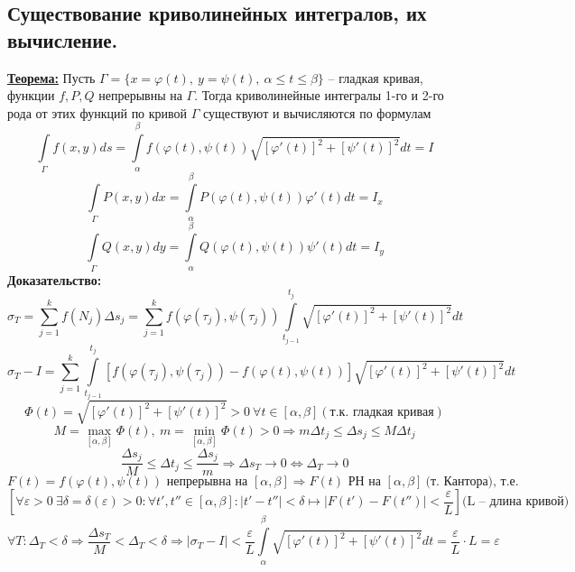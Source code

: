 \documentclass[a4paper,12pt]{article} %
\begin{document}
\subsection{Существование криволинейных интегралов, их вычисление.}
\underline{\textbf{Теорема:}} Пусть $\Gamma = \{ x = \varphi(t), ~y = \psi(t), ~\alpha \leqslant t \leqslant \beta \}$ -- гладкая кривая, функции $f, P, Q$ непрерывны на $\Gamma$. Тогда криволинейные интегралы 1-го и 2-го рода от этих функций по кривой $\Gamma$ существуют и вычисляются по формулам
\[ \int\limits_{\Gamma} f(x, y)ds = \int\limits_{\alpha}^{\beta} f(\varphi(t), \psi(t)) \sqrt{\left[ \varphi'(t) \right]^2 + \left[ \psi'(t) \right]^2}dt = I \]
\[ \int\limits_{\Gamma} P(x, y)dx = \int\limits_{\alpha}^{\beta} P(\varphi(t), \psi(t)) \varphi'(t)dt = I_x \]
\[ \int\limits_{\Gamma} Q(x, y)dy = \int\limits_{\alpha}^{\beta} Q(\varphi(t), \psi(t)) \psi'(t)dt = I_y \]
\textbf{Доказательство:} 
\[ \sigma_T = \sum\limits_{j=1}^{k} f(N_j) \Delta s_j = \sum\limits_{j=1}^{k} f(\varphi(\tau_j), \psi(\tau_j))  \int\limits_{t_{j-1}}^{t_j} \sqrt{\left[ \varphi'(t) \right]^2 + \left[ \psi'(t) \right]^2}dt \]
\[ \sigma_T - I = \sum\limits_{j=1}^{k} \int\limits_{t_{j-1}}^{t_j} \left[ f(\varphi(\tau_j), \psi(\tau_j)) - f(\varphi(t), \psi(t)) \right] \sqrt{\left[ \varphi'(t) \right]^2 + \left[ \psi'(t) \right]^2}dt \]
\[ \Phi (t) = \sqrt{\left[ \varphi'(t) \right]^2 + \left[ \psi'(t) \right]^2} > 0 \ \forall t \in [\alpha, \beta] (\text{т.к. гладкая кривая}) \]
\[ M = \max\limits_{[\alpha, \beta]} \Phi(t), \ m = \min\limits_{[\alpha, \beta]} \Phi(t) > 0 \Rightarrow m \Delta t_j \leqslant \Delta s_j \leqslant M \Delta t_j \]
\[ \dfrac{\Delta s_j}{M} \leqslant \Delta t_j \leqslant \dfrac{\Delta s_j}{m} \Rightarrow \Delta s_T \to 0 \Leftrightarrow \Delta_T \to 0 \]
\[F(t) = f(\varphi(t), \psi(t)) \text{ непрерывна на } [\alpha, \beta] \Rightarrow F(t) \text{ РН на } [\alpha, \beta] \ \text{(т. Кантора), т.е.} \]
\[ \left[ \forall \varepsilon > 0 \ \exists \delta = \delta (\varepsilon) > 0: \forall t', t'' \in [\alpha, \beta]: |t' - t''| < \delta \mapsto |F(t') - F(t'')| < \dfrac{\varepsilon}{L} \right] \text{(L -- длина кривой)} \]
\[ \forall T: \Delta_T < \delta \Rightarrow \dfrac{\Delta s_T}{M} < \Delta_T < \delta \Rightarrow \left| \sigma_T - I \right|< \dfrac{\varepsilon}{L} \int\limits_{\alpha}^{\beta} \sqrt{\left[ \varphi'(t) \right]^2 + \left[ \psi'(t) \right]^2} dt = \dfrac{\varepsilon}{L} \cdot L = \varepsilon \]
\end{document}
